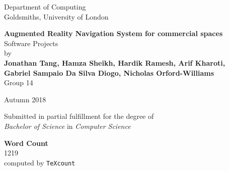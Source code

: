 \documentclass[12pt]{report}
\newcommand\blankpage{%
    \null
    \thispagestyle{empty}%
    \addtocounter{page}{-1}%
    \newpage}
\begin{document}
\begin{titlepage}
    \begin{center}
         \vspace*{1cm}
        Department of Computing\\
        Goldsmiths, University of London\\
        
        \vspace*{3.75cm}
        
        \textbf{\Large Augmented Reality Navigation System for commercial spaces}\\
        \vspace*{0.25cm}           
        Software Projects\\  
    
        \vspace*{2cm}
        by\\
        \vspace*{0.25cm}    
        \textbf{Jonathan Tang, Hamza Sheikh, Hardik Ramesh, Arif Kharoti,\\}
        \textbf{Gabriel Sampaio Da Silva Diogo, Nicholas Orford-Williams}\\
        Group 14

        \vspace{2cm}
        
        Autumn 2018
        \vfill
        
        Submitted in partial fulfillment for the degree of\\
        \textit{Bachelor of Science} in \textit{Computer Science}
        
        \vspace{1.5cm}
        
    \end{center}
\end{titlepage}
\afterpage{\blankpage}
\thispagestyle{plain}

\begin{center}    
	\large
    \textbf{Word Count}\\
    1219\\
    computed by \texttt{TeXcount}
\end{center}
\end{document}
